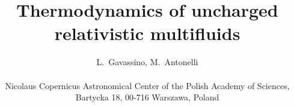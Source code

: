 \documentclass[usenatbib]{mnras}
\title[Thermodynamics of relativistic multifluids]
{Thermodynamics of uncharged relativistic multifluids}
\author[L. Gavassino \& M.Antonelli]{
L.~Gavassino, 
M.~Antonelli
\\ \\
Nicolaus Copernicus Astronomical Center of the Polish Academy of Sciences, Bartycka 18, 00-716 Warszawa, Poland
}
\begin{document}


\maketitle

\label{firstpage}

\begin{abstract}



\end{abstract}
\end{document}
